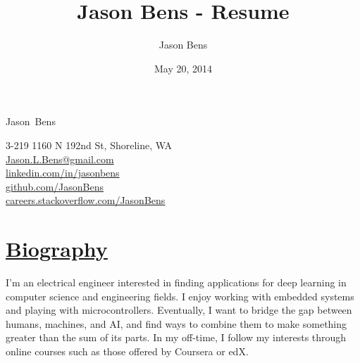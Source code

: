 \documentclass[a4paper, 11pt]{article}
\title{Jason Bens - Resume}
\author{Jason Bens}
\date{May 20, 2014}
\makeatletter
\newcommand {\firstname} {Jason}
\newcommand {\lastname} {Bens}
\newcommand {\address} {3-219 1160 N 192nd St, Shoreline, WA}
\newcommand {\phone} {\mbox{1-403-845-9125}}
\newcommand {\email} {\url{Jason.L.Bens@gmail.com}}
\newcommand {\linkedin} {\url{linkedin.com/in/jasonbens}}
\newcommand {\github} {\url{github.com/JasonBens}}
\newcommand {\careers} {\url{careers.stackoverflow.com/JasonBens}}
\makeatother
\begin{document}


\begin{minipage}[t]{0.4\textwidth}  
  \begin{flushright}
    {\Huge \firstname~\lastname}
  \end{flushright}
\end{minipage}
\hfill
\begin{minipage}{0.42\textwidth}
  \begin{flushright}
    \address \\
    \email \\
    \linkedin \\
    \github \\
    \careers \\
  \end{flushright}
\end{minipage}

\hrulefill

\section{\underline{Biography}}
I'm an electrical engineer interested in finding applications for deep learning in computer science and engineering fields. I enjoy working with embedded systems and playing with microcontrollers. Eventually, I want to bridge the gap between humans, machines, and AI, and find ways to combine them to make something greater than the sum of its parts. In my off-time, I follow my interests through online courses such as those offered by Coursera or edX.

\end{document}
